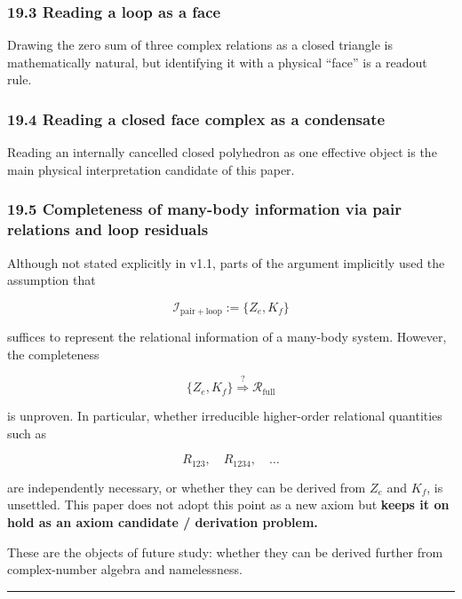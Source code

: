 \documentclass[
  a4paper,
]{article}
\begin{document}
\subsubsection{19.3 Reading a loop as a
face}\label{reading-a-loop-as-a-face}

Drawing the zero sum of three complex relations as a closed triangle is
mathematically natural, but identifying it with a physical ``face'' is a
readout rule.

\subsubsection{19.4 Reading a closed face complex as a
condensate}\label{reading-a-closed-face-complex-as-a-condensate}

Reading an internally cancelled closed polyhedron as one effective
object is the main physical interpretation candidate of this paper.

\subsubsection{19.5 Completeness of many-body information via pair
relations and loop
residuals}\label{completeness-of-many-body-information-via-pair-relations-and-loop-residuals}

Although not stated explicitly in v1.1, parts of the argument implicitly
used the assumption that

\[
\mathcal I_{\mathrm{pair+loop}}:=\{Z_e,K_f\}
\]

suffices to represent the relational information of a many-body system.
However, the completeness

\[
\boxed{\{Z_e,K_f\}\stackrel{?}{\Longrightarrow}\mathcal R_{\mathrm{full}}}
\]

is unproven. In particular, whether irreducible higher-order relational
quantities such as

\[
R_{123},\quad R_{1234},\quad\ldots
\]

are independently necessary, or whether they can be derived from \(Z_e\)
and \(K_f\), is unsettled. This paper does not adopt this point as a new
axiom but \textbf{keeps it on hold as an axiom candidate / derivation
problem.}

These are the objects of future study: whether they can be derived
further from complex-number algebra and namelessness.

\begin{center}\rule{0.5\linewidth}{0.5pt}\end{center}
\end{document}
